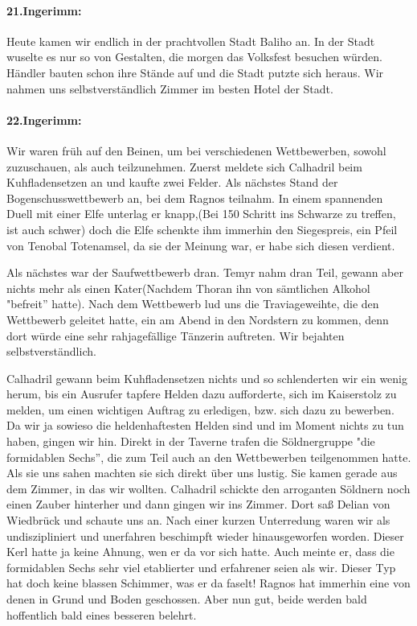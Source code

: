\paragraph{21.Ingerimm:}
Heute kamen wir endlich in der prachtvollen Stadt Baliho an. In der Stadt wuselte es nur so von Gestalten, die morgen das Volksfest besuchen würden. Händler bauten schon ihre Stände auf und die Stadt putzte sich heraus. Wir nahmen uns selbstverständlich Zimmer im besten Hotel der Stadt.

\paragraph{22.Ingerimm:}
Wir waren früh auf den Beinen, um bei verschiedenen Wettbewerben, sowohl zuzuschauen, als auch teilzunehmen. Zuerst meldete sich Calhadril beim Kuhfladensetzen an und kaufte zwei Felder. Als nächstes Stand der Bogenschusswettbewerb an, bei dem Ragnos teilnahm. In einem spannenden Duell mit einer Elfe unterlag er knapp,(Bei 150 Schritt ins Schwarze zu treffen, ist auch schwer) doch die Elfe schenkte ihm immerhin den Siegespreis, ein Pfeil von Tenobal Totenamsel, da sie der Meinung war, er habe sich diesen verdient.\par
Als nächstes war der Saufwettbewerb dran. Temyr nahm dran Teil, gewann aber nichts mehr als einen Kater(Nachdem Thoran ihn von sämtlichen Alkohol "befreit'' hatte). Nach dem Wettbewerb lud uns die Traviageweihte, die den Wettbewerb geleitet hatte, ein am Abend in den Nordstern zu kommen, denn dort würde eine sehr rahjagefällige Tänzerin auftreten. Wir bejahten selbstverständlich.\par
Calhadril gewann beim Kuhfladensetzen nichts und so schlenderten wir ein wenig herum, bis ein Ausrufer tapfere Helden dazu aufforderte, sich im Kaiserstolz zu melden, um einen wichtigen Auftrag zu erledigen, bzw. sich dazu zu bewerben. Da wir ja sowieso die heldenhaftesten Helden sind und im Moment nichts zu tun haben, gingen wir hin. Direkt in der Taverne trafen die Söldnergruppe "die formidablen Sechs'', die zum Teil auch an den Wettbewerben teilgenommen hatte. Als sie uns sahen machten sie sich direkt über uns lustig. Sie kamen gerade aus dem Zimmer, in das wir wollten. Calhadril schickte den arroganten Söldnern noch einen Zauber hinterher und dann gingen wir ins Zimmer. Dort saß Delian von Wiedbrück und schaute uns an. Nach einer kurzen Unterredung waren wir als undiszipliniert und unerfahren beschimpft wieder hinausgeworfen worden. Dieser Kerl hatte ja keine Ahnung, wen er da vor sich hatte. Auch meinte er, dass die formidablen Sechs sehr viel etablierter und erfahrener seien als wir. Dieser Typ hat doch keine blassen Schimmer, was er da faselt! Ragnos hat immerhin eine von denen in Grund und Boden geschossen. Aber nun gut, beide werden bald hoffentlich bald eines besseren belehrt. \par

